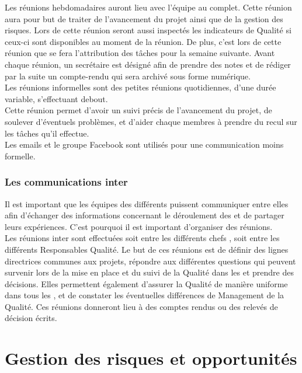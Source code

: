 Les réunions hebdomadaires auront lieu avec l’équipe au complet. Cette réunion aura pour but de traiter de l’avancement du projet ainsi que de la gestion des risques. Lors de cette réunion seront aussi inspectés les indicateurs de Qualité si ceux-ci sont disponibles au moment de la réunion. De plus, c’est lors de cette réunion que se fera l’attribution des tâches pour la semaine suivante. Avant chaque réunion, un secrétaire est désigné afin de prendre des notes et de rédiger par la suite un compte-rendu qui sera archivé sous forme numérique.\\

Les réunions informelles sont des petites réunions quotidiennes, d’une durée variable, s’effectuant debout. \\
Cette réunion permet d’avoir un suivi précis de l’avancement du projet, de soulever d'éventuels problèmes, et d’aider chaque membres à prendre du recul sur les tâches qu’il effectue.\\

Les emails et le groupe Facebook sont utilisés pour une communication moins formelle. 

\subsubsection*{Les communications inter\picCourt{}}  

Il est important que les équipes des différents \PICCourt puissent communiquer entre elles afin d’échanger des informations concernant le déroulement des \PICCourt et de partager leurs expériences. C'est pourquoi il est important d'organiser des réunions.\\

Les réunions inter\PICCourt{} sont effectuées soit entre les différents chefs \PICCourt{}, soit entre les différents Responsables Qualité. Le but de ces réunions est de définir des lignes directrices communes aux projets, répondre aux différentes questions qui peuvent survenir lors de la mise en place et du
suivi de la Qualité dans les \PICCourt et prendre des décisions. Elles permettent également d’assurer la Qualité de manière uniforme dans tous les \PICCourt, et de constater les éventuelles différences de Management de la Qualité. Ces réunions donneront lieu à des comptes rendus ou des relevés de décision écrits.

\section{Gestion des risques et opportunités} 
\label{gestion_risques_opportunitees}

